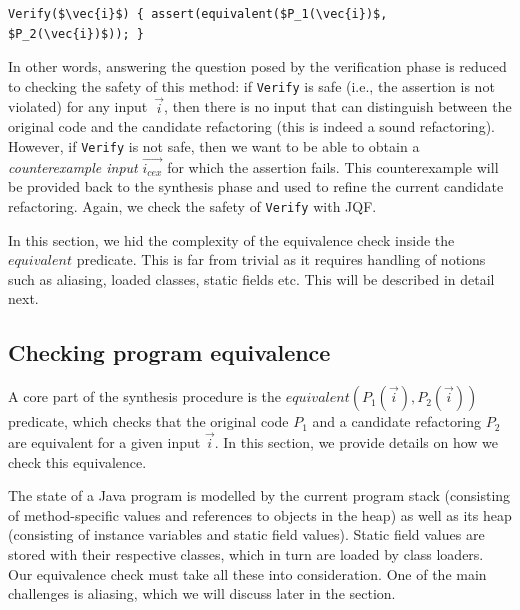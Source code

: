 \documentclass[sigconf]{acmart}
\begin{document}
\begin{lstlisting}[mathescape=true,showstringspaces=false,numbers=none]
Verify($\vec{i}$) { assert(equivalent($P_1(\vec{i})$, $P_2(\vec{i})$)); }
\end{lstlisting}

In other words, answering the question posed by the verification
phase is reduced to checking the safety of this method: if
\lstinline{Verify} is safe (i.e., the assertion is not violated) for any
input~$\vec{i}$, then there is no input that can distinguish
between the original code and the candidate refactoring (this
is indeed a sound refactoring). However, if \lstinline[breaklines=true]{Verify} is not safe,
then we want to be able to obtain a {\em counter\-example input}
$\vec{i_{cex}}$ for which the assertion fails.
%
This counterexample will be provided back to the synthesis phase and
used to refine the current candidate refactoring. Again, we check the
safety of \lstinline[breaklines=true]{Verify} with JQF.

In this section, we hid the complexity of the equivalence check inside
the $equivalent$ predicate. This is far from trivial as it requires handling
of notions such as aliasing, loaded classes, static fields etc. This will be
described in detail next.

\subsection{Checking program equivalence}\label{sec:equiv}

A core part of the synthesis procedure is the $equivalent(P_1(\vec{i}), P_2(\vec{i}))$ predicate,
which checks that the original code $P_1$ and a candidate refactoring $P_2$
are equivalent for a given input $\vec{i}$. %
In this section, we provide details on how we check this equivalence.

The state of a Java program is modelled by the current program stack
(consisting of method-specific values and references to objects in the
heap) as well as its heap (consisting of instance variables and static
field values). Static field values are stored with their respective
classes, which in turn are loaded by class loaders.  Our equivalence
check must take all these into consideration. One of the main challenges is aliasing, which we will discuss later in the section.
\end{document}

